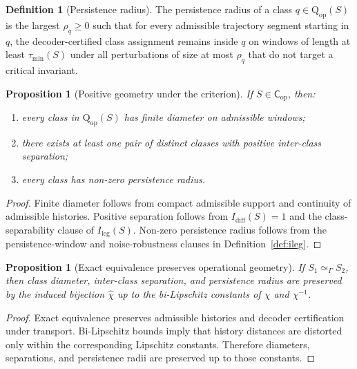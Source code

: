 \documentclass[11pt,a4paper]{article}
\newtheorem{proposition}[theorem]{Proposition}
\theoremstyle{definition}
\newtheorem{definition}[theorem]{Definition}
\newcommand{\Cop}{\mathsf{C}_{\mathrm{op}}}
\newcommand{\Qop}{\mathrm{Q}_{\mathrm{op}}}
\newcommand{\Idiff}{I_{\mathrm{diff}}}
\newcommand{\Ileg}{I_{\mathrm{leg}}}
\begin{document}
\begin{definition}[Persistence radius]\label{def:radius}
The persistence radius of a class $q \in \Qop(S)$ is the largest $\rho_q \ge 0$ such that for every admissible trajectory segment starting in $q$, the decoder-certified class assignment remains inside $q$ on windows of length at least $\tau_{\min}(S)$ under all perturbations of size at most $\rho_q$ that do not target a critical invariant.
\end{definition}

\begin{proposition}[Positive geometry under the criterion]\label{prop:geometry}
If $S \in \Cop$, then:
\begin{enumerate}[leftmargin=1.5em]
\item every class in $\Qop(S)$ has finite diameter on admissible windows;
\item there exists at least one pair of distinct classes with positive inter-class separation;
\item every class has non-zero persistence radius.
\end{enumerate}
\end{proposition}

\begin{proof}
Finite diameter follows from compact admissible support and continuity of admissible histories. Positive separation follows from $\Idiff(S)=1$ and the class-separability clause of $\Ileg(S)$. Non-zero persistence radius follows from the persistence-window and noise-robustness clauses in Definition~\ref{def:ileg}.
\end{proof}

\begin{proposition}[Exact equivalence preserves operational geometry]\label{prop:geometry-transfer}
If $S_1 \simeq_{\Gamma} S_2$, then class diameter, inter-class separation, and persistence radius are preserved by the induced bijection $\widehat{\chi}$ up to the bi-Lipschitz constants of $\chi$ and $\chi^{-1}$.
\end{proposition}

\begin{proof}
Exact equivalence preserves admissible histories and decoder certification under transport. Bi-Lipschitz bounds imply that history distances are distorted only within the corresponding Lipschitz constants. Therefore diameters, separations, and persistence radii are preserved up to those constants.
\end{proof}
\end{document}
